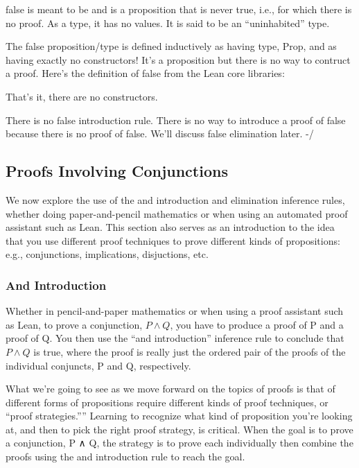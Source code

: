 \documentclass[letterpaper,10pt,english]{sphinxmanual}
\begin{document}
false is meant to be and is a proposition that is never true, i.e.,
for which there is no proof. As a type, it has no values.  It is said
to be an “uninhabited” type.

The false proposition/type is defined inductively as having type,
Prop, and as having exactly no constructors! It’s a proposition but
there is no way to contruct a proof. Here’s the definition of false
from the Lean core libraries:

\begin{sphinxVerbatim}[commandchars=\\\{\}]
   
\end{sphinxVerbatim}

That’s it, there are no constructors.

There is no false introduction rule.  There is no way to introduce a
proof of false because there is no proof of false.  We’ll discuss
false elimination later.  -/


\subsection{Proofs Involving Conjunctions}
\label{\detokenize{15-proofs:proofs-involving-conjunctions}}
We now explore the use of the and introduction and elimination
inference rules, whether doing paper-and-pencil mathematics or when
using an automated proof assistant such as Lean. This section also
serves as an introduction to the idea that you use different proof
techniques to prove different kinds of propositions: e.g.,
conjunctions, implications, disjuctions, etc.


\subsubsection{And Introduction}
\label{\detokenize{15-proofs:and-introduction}}
Whether in pencil-and-paper mathematics or when using a proof
assistant such as Lean, to prove a conjunction, \(P \land Q\), you
have to produce a proof of P and a proof of Q. You then use the “and
introduction” inference rule to conclude that \(P \land Q\) is
true, where the proof is really just the ordered pair of the proofs of
the individual conjuncts, P and Q, respectively.

What we’re going to see as we move forward on the topics of proofs is
that of different forms of propositions require different kinds of
proof techniques, or “proof strategies.””  Learning to recognize what
kind of proposition you’re looking at, and then to pick the right
proof strategy, is critical. When the goal is to prove a conjunction,
P ∧ Q, the strategy is to prove each individually then combine the
proofs using the and introduction rule to reach the goal.
\end{document}
